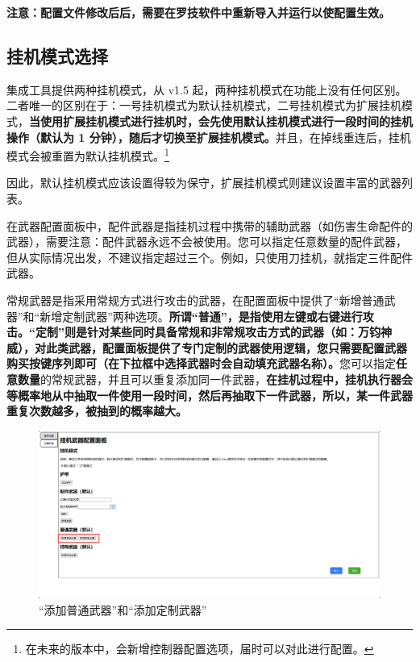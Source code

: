 \textbf{\color{red}注意：配置文件修改后后，需要在罗技软件中重新导入并运行以使配置生效。}

\subsection{挂机模式选择}

集成工具提供两种挂机模式，从 v1.5 起，两种挂机模式在功能上没有任何区别。二者唯一的区别在于：一号挂机模式为默认挂机模式，二号挂机模式为扩展挂机模式，\textbf{当使用扩展挂机模式进行挂机时，会先使用默认挂机模式进行一段时间的挂机操作（默认为 1 分钟），随后才切换至扩展挂机模式。}并且，在掉线重连后，挂机模式会被重置为默认挂机模式。\footnote{在未来的版本中，会新增控制器配置选项，届时可以对此进行配置。}

因此，默认挂机模式应该设置得较为保守，扩展挂机模式则建议设置丰富的武器列表。

在武器配置面板中，配件武器是指挂机过程中携带的辅助武器（如伤害生命配件的武器），需要注意：配件武器永远不会被使用。您可以指定任意数量的配件武器，但从实际情况出发，不建议指定超过三个。例如，只使用刀挂机，就指定三件配件武器。

常规武器是指采用常规方式进行攻击的武器，在配置面板中提供了“新增普通武器”和“新增定制武器”两种选项。\textbf{\color{red}所谓“普通”，是指使用左键或右键进行攻击。“定制”则是针对某些同时具备常规和非常规攻击方式的武器（如：万钧神威），对此类武器，配置面板提供了专门定制的武器使用逻辑，您只需要配置武器购买按键序列即可（在下拉框中选择武器时会自动填充武器名称）。}您可以指定\textbf{\color{red}任意数量}的常规武器，并且可以重复添加同一件武器，\textbf{在挂机过程中，挂机执行器会等概率地从中抽取一件使用一段时间，然后再抽取下一件武器，所以，某一件武器重复次数越多，被抽到的概率越大。}

\begin{figure}[H]
    \Centering
    \includegraphics[width=\textwidth]{assets/about_conventional_weapons}
    \caption{“添加普通武器”和“添加定制武器”}
\end{figure}

